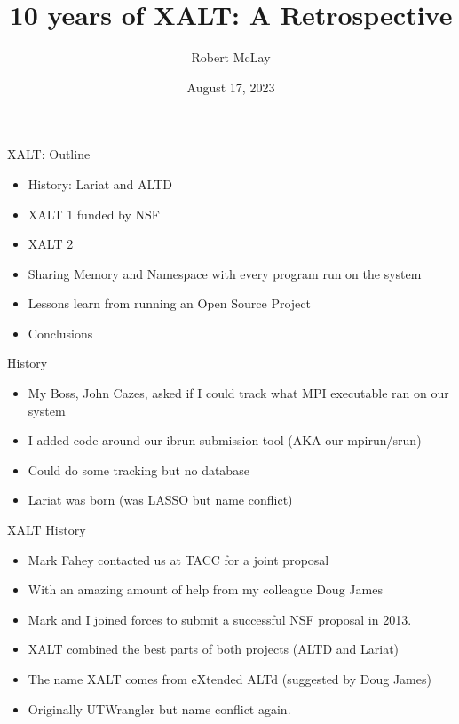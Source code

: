 \documentclass{beamer}
\begin{document}
\title[XALT]{10 years of XALT: A Retrospective}
\author{Robert McLay}
\date{August 17, 2023}

\frame{\titlepage}

\begin{frame}{XALT: Outline}
  \begin{itemize}
    \item History: Lariat and ALTD
    \item XALT 1 funded by NSF
    \item XALT 2
    \item Sharing Memory and Namespace with every program run on the
      system
    \item Lessons learn from running an Open Source Project
    \item Conclusions
  \end{itemize}
\end{frame}

\begin{frame}{History}
  \begin{itemize}
    \item My Boss, John Cazes, asked if I could track what MPI
      executable ran on our system
    \item I added code around our ibrun submission tool (AKA our mpirun/srun)
    \item Could do some tracking but no database
    \item Lariat was born (was LASSO but name conflict)
  \end{itemize}
\end{frame}

\begin{frame}{XALT History}
  \begin{itemize}
    \item Mark Fahey contacted us at TACC for a joint proposal
    \item With an amazing amount of help from my colleague Doug James
    \item Mark and I joined forces to submit a successful NSF proposal
      in 2013.
    \item XALT combined the best parts of both projects (ALTD and
      Lariat)
    \item The name XALT comes from eXtended ALTd (suggested by Doug
      James)
    \item Originally UTWrangler but name conflict again.
  \end{itemize}
\end{frame}
\end{document}
